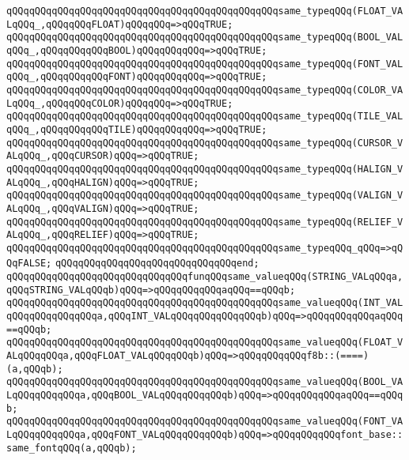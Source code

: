 \verb|qQQqqQQqqQQqqQQqqQQqqQQqqQQqqQQqqQQqqQQqqQQqqQQqsame_typeqQQq(FLOAT_VALqQQq_,qQQqqQQqFLOAT)qQQqqQQq=>qQQqTRUE;|\newline
\verb|qQQqqQQqqQQqqQQqqQQqqQQqqQQqqQQqqQQqqQQqqQQqqQQqsame_typeqQQq(BOOL_VALqQQq_,qQQqqQQqqQQqBOOL)qQQqqQQqqQQq=>qQQqTRUE;|\newline
\verb|qQQqqQQqqQQqqQQqqQQqqQQqqQQqqQQqqQQqqQQqqQQqqQQqsame_typeqQQq(FONT_VALqQQq_,qQQqqQQqqQQqFONT)qQQqqQQqqQQq=>qQQqTRUE;|\newline
\verb|qQQqqQQqqQQqqQQqqQQqqQQqqQQqqQQqqQQqqQQqqQQqqQQqsame_typeqQQq(COLOR_VALqQQq_,qQQqqQQqCOLOR)qQQqqQQq=>qQQqTRUE;|\newline
\verb|qQQqqQQqqQQqqQQqqQQqqQQqqQQqqQQqqQQqqQQqqQQqqQQqsame_typeqQQq(TILE_VALqQQq_,qQQqqQQqqQQqTILE)qQQqqQQqqQQq=>qQQqTRUE;|\newline
\verb|qQQqqQQqqQQqqQQqqQQqqQQqqQQqqQQqqQQqqQQqqQQqqQQqsame_typeqQQq(CURSOR_VALqQQq_,qQQqCURSOR)qQQq=>qQQqTRUE;|\newline
\verb|qQQqqQQqqQQqqQQqqQQqqQQqqQQqqQQqqQQqqQQqqQQqqQQqsame_typeqQQq(HALIGN_VALqQQq_,qQQqHALIGN)qQQq=>qQQqTRUE;|\newline
\verb|qQQqqQQqqQQqqQQqqQQqqQQqqQQqqQQqqQQqqQQqqQQqqQQqsame_typeqQQq(VALIGN_VALqQQq_,qQQqVALIGN)qQQq=>qQQqTRUE;|\newline
\verb|qQQqqQQqqQQqqQQqqQQqqQQqqQQqqQQqqQQqqQQqqQQqqQQqsame_typeqQQq(RELIEF_VALqQQq_,qQQqRELIEF)qQQq=>qQQqTRUE;|\newline
\verb|qQQqqQQqqQQqqQQqqQQqqQQqqQQqqQQqqQQqqQQqqQQqqQQqsame_typeqQQq_qQQq=>qQQqFALSE;|\newline
\verb|qQQqqQQqqQQqqQQqqQQqqQQqqQQqqQQqend;|\newline
\newline
\verb|qQQqqQQqqQQqqQQqqQQqqQQqqQQqqQQqfunqQQqsame_valueqQQq(STRING_VALqQQqa,qQQqSTRING_VALqQQqb)qQQq=>qQQqqQQqqQQqaqQQq==qQQqb;|\newline
\verb|qQQqqQQqqQQqqQQqqQQqqQQqqQQqqQQqqQQqqQQqqQQqqQQqsame_valueqQQq(INT_VALqQQqqQQqqQQqqQQqa,qQQqINT_VALqQQqqQQqqQQqqQQqb)qQQq=>qQQqqQQqqQQqaqQQq==qQQqb;|\newline
\verb|qQQqqQQqqQQqqQQqqQQqqQQqqQQqqQQqqQQqqQQqqQQqqQQqsame_valueqQQq(FLOAT_VALqQQqqQQqa,qQQqFLOAT_VALqQQqqQQqb)qQQq=>qQQqqQQqqQQqf8b::(====)(a,qQQqb);|\newline
\verb|qQQqqQQqqQQqqQQqqQQqqQQqqQQqqQQqqQQqqQQqqQQqqQQqsame_valueqQQq(BOOL_VALqQQqqQQqqQQqa,qQQqBOOL_VALqQQqqQQqqQQqb)qQQq=>qQQqqQQqqQQqaqQQq==qQQqb;|\newline
\verb|qQQqqQQqqQQqqQQqqQQqqQQqqQQqqQQqqQQqqQQqqQQqqQQqsame_valueqQQq(FONT_VALqQQqqQQqqQQqa,qQQqFONT_VALqQQqqQQqqQQqb)qQQq=>qQQqqQQqqQQqfont_base::same_fontqQQq(a,qQQqb);|\newline
